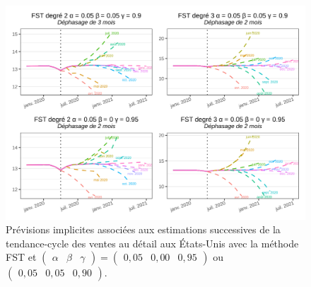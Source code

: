 \documentclass[
  12pt,
  french,
  12pt,a4paper]{article}
\newcommand\1{\mathds{1}}
\begin{document}
\begin{figure}

{\centering \includegraphics[width=0.9\linewidth]{img/nber/retailx_fstp1_implicit_forecast} 

}

\caption[Prévisions implicites associées aux estimations successives de la tendance-cycle des ventes au détail aux États-Unis avec la méthode FST et \(\begin{pmatrix}\alpha&\beta&\gamma\end{pmatrix} = \begin{pmatrix}0,05 &0,00&0,95\end{pmatrix}\) ou \(\begin{pmatrix}0,05 &0,05&0,90\end{pmatrix}\)]{Prévisions implicites associées aux estimations successives de la tendance-cycle des ventes au détail aux États-Unis avec la méthode FST et \(\begin{pmatrix}\alpha&\beta&\gamma\end{pmatrix} = \begin{pmatrix}0,05 &0,00&0,95\end{pmatrix}\) ou \(\begin{pmatrix}0,05 &0,05&0,90\end{pmatrix}\).}\label{fig:retailxipfst1}

\footnotesize
\normalsize\end{figure}
\end{document}

